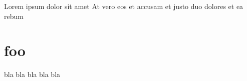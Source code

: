 \documentclass{article}
\begin{document}
    Lorem ipsum dolor sit amet
    At vero eos et accusam et justo duo dolores et ea rebum

    \section{foo\label{foo}}
    bla bla bla bla bla
\end{document}
